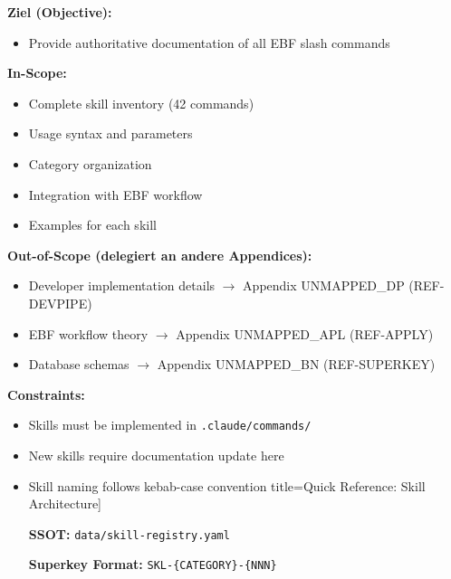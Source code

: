 
\begin{tcolorbox}[
    colback=orange!5!white,
    colframe=orange!75!black,
    title={\textbf{Appendix Scope: Ziel / In-Scope / Out-of-Scope / Constraints}},
    fonttitle=\bfseries
]

\textbf{Ziel (Objective):}
\begin{itemize}[nosep]
    \item Provide authoritative documentation of all EBF slash commands
\end{itemize}

\textbf{In-Scope:}
\begin{itemize}[nosep]
    \item Complete skill inventory (42 commands)
    \item Usage syntax and parameters
    \item Category organization
    \item Integration with EBF workflow
    \item Examples for each skill
\end{itemize}

\textbf{Out-of-Scope (delegiert an andere Appendices):}
\begin{itemize}[nosep]
    \item Developer implementation details $\rightarrow$ Appendix UNMAPPED_DP (REF-DEVPIPE)
    \item EBF workflow theory $\rightarrow$ Appendix UNMAPPED_APL (REF-APPLY)
    \item Database schemas $\rightarrow$ Appendix UNMAPPED_BN (REF-SUPERKEY)
\end{itemize}

\textbf{Constraints:}
\begin{itemize}[nosep]
    \item Skills must be implemented in \texttt{.claude/commands/}
    \item New skills require documentation update here
    \item Skill naming follows kebab-case convention
    title=Quick Reference: Skill Architecture]

\textbf{SSOT:} \texttt{data/skill-registry.yaml}

\textbf{Superkey Format:} \texttt{SKL-\{CATEGORY\}-\{NNN\}}


\end{itemize}
\end{tcolorbox}
